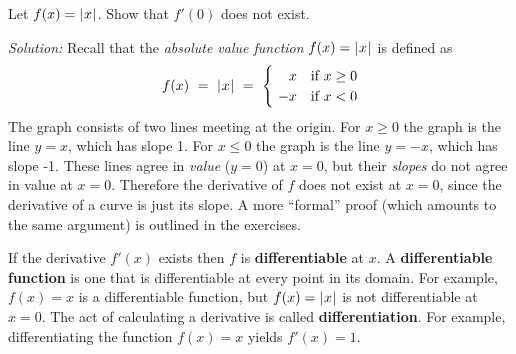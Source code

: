 \begin{exmp}\label{exmp:absnondiff}
 \par\noindent Let $f(x) = \lvert\mspace{1mu}x\mspace{1mu}\rvert$. Show that $f'(0)$ does not
 exist.\vspace{1mm}
 \par\noindent\emph{Solution:} Recall that the \emph{absolute value
 function} $f(x) = \lvert\mspace{1mu}x\mspace{1mu}\rvert$
 is defined as
 \begin{displaymath}
  f(x) ~=~ \lvert\mspace{1mu}x\mspace{1mu}\rvert ~=~ \begin{cases}
                        \phantom{~-}x & \text{if } x \ge 0\\
                        ~-x & \text{if } x < 0
                       \end{cases}
 \end{displaymath}
 The graph consists of two lines meeting at the origin. For
 $x \ge 0$ the graph is the line $y = x$, which has slope 1. For $x \le 0$ the
 graph is the line $y = -x$, which has slope -1. These lines agree in
 \emph{value} ($y=0$) at $x=0$, but their \emph{slopes} do not agree in value
 at $x=0$. Therefore the derivative of $f$ does not exist at $x=0$, since
 the derivative of a curve is just its slope. A more ``formal'' proof (which
 amounts to the same argument) is outlined in the exercises.
\end{exmp}
\divider
\newpage
If the derivative $f'(x)$ exists then $f$ is
\textbf{differentiable} at
$x$. A \textbf{differentiable function} is one that is differentiable at every
point in its domain. For example, $f(x) = x$ is a differentiable function, but
$f(x) = \lvert\mspace{1mu}x\mspace{1mu}\rvert$ is not differentiable at $x=0$. The act of calculating a
derivative is called \textbf{differentiation}. For
example, differentiating the function $f(x) = x$ yields $f'(x) = 1$.\vspace{3mm}

